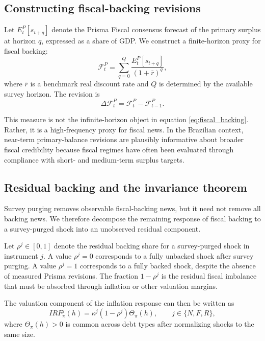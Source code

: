 \documentclass[12pt,a4paper]{article}
\begin{document}
\subsection{Constructing fiscal-backing revisions}

Let \(E_t^P[s_{t+q}]\) denote the Prisma Fiscal consensus forecast of the primary surplus at horizon \(q\), expressed as a share of GDP. We construct a finite-horizon proxy for fiscal backing:
\begin{equation}
\mathcal{F}_t^{P}
=
\sum_{q=0}^{Q}
\frac{E_t^P[s_{t+q}]}{(1+\bar r)^q},
\label{eq:prisma_pv}
\end{equation}
where \(\bar r\) is a benchmark real discount rate and \(Q\) is determined by the available survey horizon. The revision is
\begin{equation}
\Delta \mathcal{F}_t^{P}
=
\mathcal{F}_t^{P}-\mathcal{F}_{t-1}^{P}.
\label{eq:prisma_revision}
\end{equation}

This measure is not the infinite-horizon object in equation \eqref{eq:fiscal_backing}. Rather, it is a high-frequency proxy for fiscal news. In the Brazilian context, near-term primary-balance revisions are plausibly informative about broader fiscal credibility because fiscal regimes have often been evaluated through compliance with short- and medium-term surplus targets.

\subsection{Residual backing and the invariance theorem}

Survey purging removes observable fiscal-backing news, but it need not remove all backing news. We therefore decompose the remaining response of fiscal backing to a survey-purged shock into an unobserved residual component.

Let \(\rho^j\in[0,1]\) denote the residual backing share for a survey-purged shock in instrument \(j\). A value \(\rho^j=0\) corresponds to a fully unbacked shock after survey purging. A value \(\rho^j=1\) corresponds to a fully backed shock, despite the absence of measured Prisma revisions. The fraction \(1-\rho^j\) is the residual fiscal imbalance that must be absorbed through inflation or other valuation margins.

The valuation component of the inflation response can then be written as
\begin{equation}
IRF_{\pi}^{j}(h)
=
\kappa^j(1-\rho^j)\Theta_{\pi}(h),
\qquad
j\in\{N,F,R\},
\label{eq:irf_rho}
\end{equation}
where \(\Theta_{\pi}(h)>0\) is common across debt types after normalizing shocks to the same size.
\end{document}
